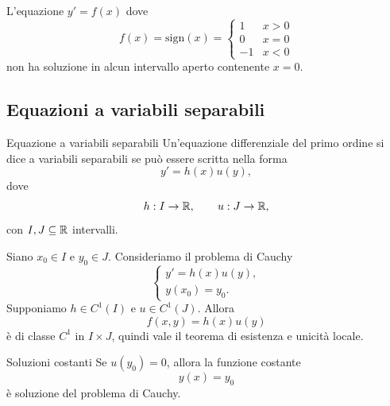 \documentclass[a4paper]{article}
\begin{document}
\begin{radioactive}
\begin{snippetexample}{}
    L'equazione \(y' = f(x)\) dove
    \[
        f(x) = \text{sign}(x) = \begin{cases}
            1 & x > 0 \\
            0 & x = 0 \\
            -1 & x < 0
        \end{cases}
    \]
    non ha soluzione in alcun intervallo aperto contenente \(x=0\).
\end{snippetexample}
\end{radioactive}

\subsection{Equazioni a variabili separabili}

\begin{radioactive}
\begin{snippetdefinition}{Equazione a variabili separabili}
    Un'equazione differenziale del primo ordine si dice a variabili separabili se può essere scritta nella forma
    \[
        y'=h(x)u(y),
    \]
    dove
    \[
        h:I\to\mathbb{R},
        \qquad
        u:J\to\mathbb{R},
    \]
    con \(I,J\subseteq\mathbb{R}\) intervalli.
\end{snippetdefinition}
\end{radioactive}

\begin{radioactive}
Siano \(x_0\in I\) e \(y_0\in J\). Consideriamo il problema di Cauchy
\[
    \begin{cases}
        y'=h(x)u(y),\\
        y(x_0)=y_0.
    \end{cases}
\]
Supponiamo \(h\in C^1(I)\) e \(u\in C^1(J)\). Allora
\[
    f(x,y)=h(x)u(y)
\]
è di classe \(C^1\) in \(I\times J\), quindi vale il teorema di esistenza e unicità locale.
\end{radioactive}

\begin{radioactive}
\begin{snippetproposition}{Soluzioni costanti}
    Se \(u(y_0)=0\), allora la funzione costante
    \[
        y(x)=y_0
    \]
    è soluzione del problema di Cauchy.
\end{snippetproposition}
\end{radioactive}
\end{document}
